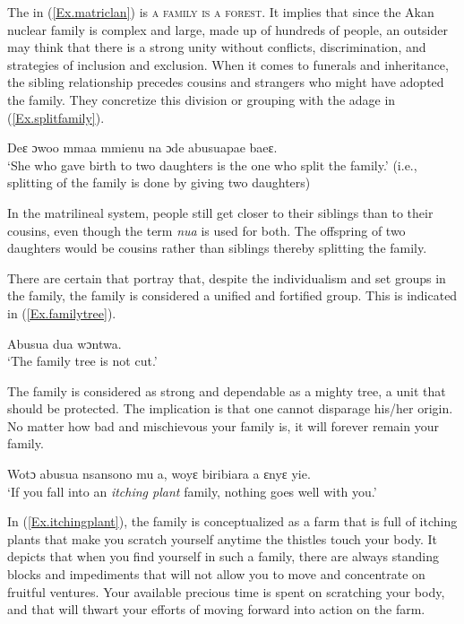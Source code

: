 \documentclass[output=paper,colorlinks,citecolor=brown]{langscibook}
\begin{document}
The  in (\ref{Ex.matriclan}) is \textsc{a family is a forest}. It implies that since the Akan nuclear family is complex and large, made up of hundreds of people, an outsider may think that there is a strong unity without conflicts, discrimination, and strategies of inclusion and exclusion. When it comes to funerals and inheritance, the sibling relationship precedes cousins and strangers who might have adopted the family. They concretize this division or grouping with the adage in (\ref{Ex.splitfamily}).

\ea \label{Ex.splitfamily}
\gl Deɛ ɔwoo mmaa mmienu na ɔde abusuapae baeɛ.\\
\glt  ‘She who gave birth to two daughters is the one who split the family.' (i.e., splitting of the family is done by giving two daughters)
\z

In the matrilineal system, people still get closer to their siblings than to their cousins, even though the term \textit{nua} is used for both. The offspring of two daughters would be cousins rather than siblings thereby splitting the family.

There are certain  that portray that, despite the individualism and set groups in the family, the family is considered a unified and fortified group. This is indicated in (\ref{Ex.familytree}).

\ea \label{Ex.familytree}
\gl Abusua dua wɔntwa.\\
\glt  ‘The family tree is not cut.'
\z

The family is considered as strong and dependable as a mighty tree, a unit that should be protected. The implication is that one cannot disparage his/her origin. No matter how bad and mischievous your family is, it will forever remain your family.

\ea \label{Ex.itchingplant}
\gl Wotɔ abusua nsansono mu a, woyɛ biribiara a ɛnyɛ yie.\\
\glt  ‘If you fall into an \textit{itching plant} family, nothing goes well with you.'
\z

In (\ref{Ex.itchingplant}), the family is conceptualized as a farm that is full of itching plants that make you scratch yourself anytime the thistles touch your body. It depicts that when you find yourself in such a family, there are always standing blocks and impediments that will not allow you to move and concentrate on fruitful ventures. Your available precious time is spent on scratching your body, and that will thwart your efforts of moving forward into action on the farm.
\end{document}
